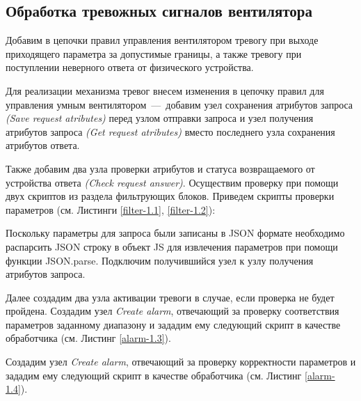 \documentclass[a4paper,14pt]{extarticle}
\begin{document}
\subsection{Обработка тревожных сигналов вентилятора}

Добавим в цепочки правил управления вентилятором тревогу при выходе приходящего параметра за допустимые границы, а также тревогу при поступлении неверного ответа от физического устройства.

Для реализации механизма тревог внесем изменения в цепочку правил для управления умным вентилятором~---~добавим узел сохранения атрибутов запроса \textit{(Save request atributes)} перед узлом отправки запроса и узел получения атрибутов запроса \textit{(Get request atributes)} вместо последнего узла сохранения атрибутов ответа.

Также добавим два узла проверки атрибутов и статуса возвращаемого от устройства ответа \textit{(Check request answer)}. Осуществим проверку при помощи двух скриптов из раздела фильтрующих блоков.
Приведем скрипты проверки параметров (см. Листинги \ref{filter-1.1}, \ref{filter-1.2}):







Поскольку параметры для запроса были записаны в JSON формате необходимо распарсить JSON строку в объект JS для извлечения параметров при помощи функции JSON.parse. 
Подключим получившийся узел к узлу получения атрибутов запроса.

Далее создадим два узла активации тревоги в случае, если проверка не будет пройдена. Создадим узел \textit{Create alarm}, отвечающий за проверку соответствия параметров заданному диапазону и зададим ему следующий скрипт в качестве обработчика (см. Листинг \ref{alarm-1.3}).

\newpage



Создадим узел \textit{Create alarm}, отвечающий за проверку корректности параметров и зададим ему следующий скрипт в качестве обработчика (см. Листинг \ref{alarm-1.4}).
\end{document}
